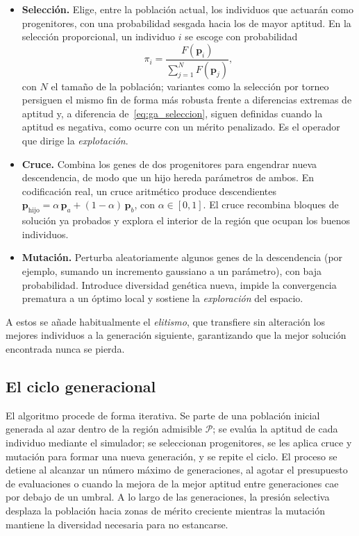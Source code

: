 \begin{itemize}
    \item \textbf{Selección.} Elige, entre la población actual, los individuos que
    actuarán como progenitores, con una probabilidad sesgada hacia los de mayor
    aptitud. En la selección proporcional, un individuo $i$ se escoge con
    probabilidad
    \begin{equation}
        \pi_i = \frac{F(\mathbf{p}_i)}{\sum_{j=1}^{N} F(\mathbf{p}_j)},
        \label{eq:ga_seleccion}
    \end{equation}
    con $N$ el tamaño de la población; variantes como la selección por torneo
    persiguen el mismo fin de forma más robusta frente a diferencias extremas de
    aptitud y, a diferencia de~\eqref{eq:ga_seleccion}, siguen definidas cuando la
    aptitud es negativa, como ocurre con un mérito penalizado.
    Es el operador que dirige la \emph{explotación}.

    \item \textbf{Cruce.} Combina los genes de dos progenitores para engendrar nueva
    descendencia, de modo que un hijo hereda parámetros de ambos. En codificación
    real, un cruce aritmético produce descendientes
    $\mathbf{p}_{\text{hijo}} = \alpha\,\mathbf{p}_a + (1-\alpha)\,\mathbf{p}_b$,
    con $\alpha\in[0,1]$. El cruce recombina bloques de solución ya probados y
    explora el interior de la región que ocupan los buenos individuos.

    \item \textbf{Mutación.} Perturba aleatoriamente algunos genes de la
    descendencia (por ejemplo, sumando un incremento gaussiano a un parámetro), con
    baja probabilidad. Introduce diversidad genética nueva, impide la convergencia
    prematura a un óptimo local y sostiene la \emph{exploración} del espacio.
\end{itemize}

A estos se añade habitualmente el \emph{elitismo}, que transfiere sin alteración los
mejores individuos a la generación siguiente, garantizando que la mejor solución
encontrada nunca se pierda.

\subsection{El ciclo generacional}
\label{sec:ga_ciclo}

El algoritmo procede de forma iterativa. Se parte de una población inicial generada
al azar dentro de la región admisible $\mathcal{P}$; se evalúa la aptitud de cada
individuo mediante el simulador; se seleccionan progenitores, se les aplica cruce y
mutación para formar una nueva generación, y se repite el ciclo. El proceso se
detiene al alcanzar un número máximo de generaciones, al agotar el presupuesto de
evaluaciones o cuando la mejora de la mejor aptitud entre generaciones cae por
debajo de un umbral. A lo largo de las generaciones, la presión selectiva desplaza
la población hacia zonas de mérito creciente mientras la mutación mantiene la
diversidad necesaria para no estancarse.


